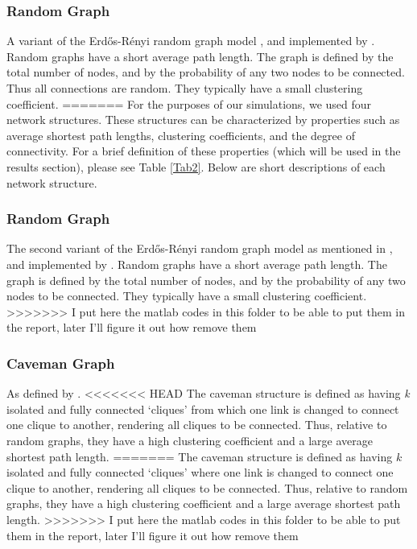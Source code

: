 \subsubsection{Random Graph}

A variant of the Erd\H{o}s-R\'enyi random graph model \citep*{ER1960}, and implemented by \citet*{BS2011}.
Random graphs have a short average path length. The graph is defined by the total number of nodes, and by the probability of any two nodes to be connected. Thus all connections are random. They typically have a small clustering coefficient.
=======
For the purposes of our simulations, we used four network structures. These structures can be characterized by properties such as average shortest path lengths, clustering coefficients, and the degree of connectivity. For a brief definition of these properties (which will be used in the results section), please see Table \ref{Tab2}. Below are short descriptions of each network structure.



\subsubsection{Random Graph}

The second variant of the Erd\H{o}s-R\'enyi random graph model \citep{ER1960} as mentioned in \citet{Wiki}, and implemented by \citet*{BS2011}.
Random graphs have a short average path length. The graph is defined by the total number of nodes, and by the probability of any two nodes to be connected. They typically have a small clustering coefficient.
>>>>>>> I put here the matlab codes in this folder to be able to put them in the report, later I'll figure it out how remove them

\subsubsection{Caveman Graph}

As defined by \citet*{W2003}.
<<<<<<< HEAD
The caveman structure is defined as having \emph{k} isolated and fully connected `cliques' from which one link is changed to connect one clique to another, rendering all cliques to be connected. Thus, relative to random graphs, they have a high clustering coefficient and a large average shortest path length.
=======
The caveman structure is defined as having $k$ isolated and fully connected `cliques' where one link is changed to connect one clique to another, rendering all cliques to be connected. Thus, relative to random graphs, they have a high clustering coefficient and a large average shortest path length.
>>>>>>> I put here the matlab codes in this folder to be able to put them in the report, later I'll figure it out how remove them

